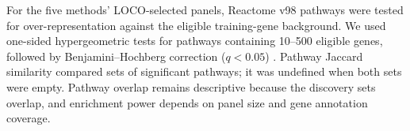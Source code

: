 For the five methods' LOCO-selected panels, Reactome v98 pathways \cite{ragueneau2026reactome} were tested for over-representation against the eligible training-gene background. We used one-sided hypergeometric tests for pathways containing 10--500 eligible genes, followed by Benjamini--Hochberg correction ($q<0.05$) \cite{benjamini1995fdr}. Pathway Jaccard similarity compared sets of significant pathways; it was undefined when both sets were empty. Pathway overlap remains descriptive because the discovery sets overlap, and enrichment power depends on panel size and gene annotation coverage.
